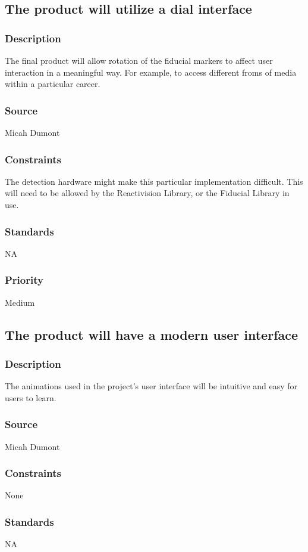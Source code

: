 \subsection{The product will utilize a dial interface}
\subsubsection{Description}
The final product will allow rotation of the fiducial markers to affect user interaction in a meaningful way. For example, to access different froms of media within a particular career.
\subsubsection{Source}
Micah Dumont
\subsubsection{Constraints}
The detection hardware might make this particular implementation difficult. This will need to be allowed by the Reactivision Library, or the Fiducial Library in use.
\subsubsection{Standards}
NA
\subsubsection{Priority}
Medium

\subsection{The product will have a modern user interface}
\subsubsection{Description}
The animations used in the project's user interface will be intuitive and easy for users to learn.
\subsubsection{Source}
Micah Dumont
\subsubsection{Constraints}
None
\subsubsection{Standards}
NA
